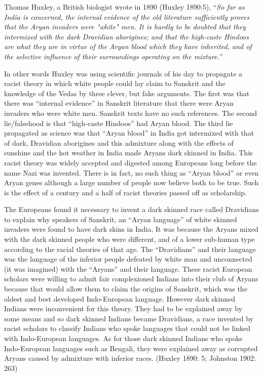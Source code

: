 Thomas Huxley, a British biologist wrote in 1890 (Huxley 1890:5), “\textit{So far as India is concerned, the internal evidence of the old literature sufficiently proves that the Aryan invaders were "white" men. It is hardly to be doubted that they intermixed with the dark Dravidian aborigines; and that the high-caste Hindoos are what they are in virtue of the Aryan blood which they have inherited, and of the selective influence of their surroundings operating on the mixture.}”

In other words Huxley was using scientific journals of his day to propagate a racist theory in which white people could lay claim to Sanskrit and the knowledge of the Vedas by three clever, but fake arguments. The first was that there was “internal evidence” in Sanskrit literature that there were Aryan invaders who were white men. Sanskrit texts have no such references. The second lie/falsehood is that “high-caste Hindoos” had Aryan blood. The third lie propagated as science was that “Aryan blood” in India got intermixed with that of dark, Dravidian aborigines and this admixture along with the effects of sunshine and the hot weather in India made Aryans dark skinned in India. This racist theory was widely accepted and digested among Europeans long before the name Nazi was invented. There is in fact, no such thing as “Aryan blood” or even Aryan genes although a large number of people now believe both to be true. Such is the effect of a century and a half of racist theories passed off as scholarship.

The Europeans found it necessary to invent a dark skinned race called Dravidians to explain why speakers of Sanskrit, an “Aryan language” of white skinned invaders were found to have dark skins in India. It was because the Aryans mixed with the dark skinned people who were different, and of a lower sub-human type according to the racial theories of that age. The “Dravidians” and their language was the language of the inferior people defeated by white man and unconnected (it was imagined) with the “Aryans” and their language. These racist European scholars were willing to admit fair complexioned Indians into their club of Aryans because that would allow them to claim the origins of Sanskrit, which was the oldest and best developed Indo-European language. However dark skinned Indians were inconvenient for this theory. They had to be explained away by some means and so dark skinned Indians became Dravidians, a race invented by racist scholars to classify Indians who spoke languages that could not be linked with Indo-European languages. As for those dark skinned Indians who spoke Indo-European languages such as Bengali, they were explained away as corrupted Aryans caused by admixture with inferior races. (Huxley 1890: 5; Johnston 1902: 263)

